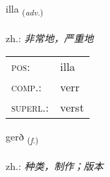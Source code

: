 \documentclass[frontgrid, backgrid]{flacards}\usepackage[]{graphicx}\usepackage[]{xcolor}
\begin{document}
\renewcommand{\blhead}{\vskip5pt {\small\bfseries\footnotesize Atviksorð | 副词 }}
\renewcommand{\bcfoot}{\vskip5pt \hspace{2pt}{\small\bfseries\footnotesize 1K}}


{illa \small{\textsubscript{(\textit{adv.})}} \\[1ex] %
\textphonetic{[ɪtla]} \\
zh.: \emph{非常地，严重地} \\  [2ex]
\renewcommand*{\arraystretch}{0.8}
\begin{tabular}{ll}
\textsc{pos}: & illa \\ 
\textsc{comp.}: & verr \\ 
\textsc{superl.}: & verst \\
\end{tabular}
}

\renewcommand{\flhead}{\vskip5pt \fboxsep=0pt {\small\bfseries\footnotesize Nafnorð | 名词}}
\renewcommand{\fcfoot}{\vskip5pt \fboxsep=0pt \hspace{2pt}{\small\bfseries\footnotesize 1K}}

\renewcommand{\blhead}{\vskip5pt {\small\bfseries\footnotesize Nafnorð | 名词 }}
\renewcommand{\bcfoot}{\vskip5pt \hspace{2pt}{\small\bfseries\footnotesize 1K}}


{gerð \small{\textsubscript{(\textit{f.})}} \\[1ex] %
\textphonetic{[cɛrð]} \\
zh.: \emph{种类，制作；版本} \\  [2ex]
\renewcommand*{\arraystretch}{0.8}
}

\renewcommand{\flhead}{\vskip5pt \fboxsep=0pt {\small\bfseries\footnotesize Lýsingarorð | 形容词}}
\renewcommand{\fcfoot}{\vskip5pt \fboxsep=0pt \hspace{2pt}{\small\bfseries\footnotesize 1K}}
\end{document}
